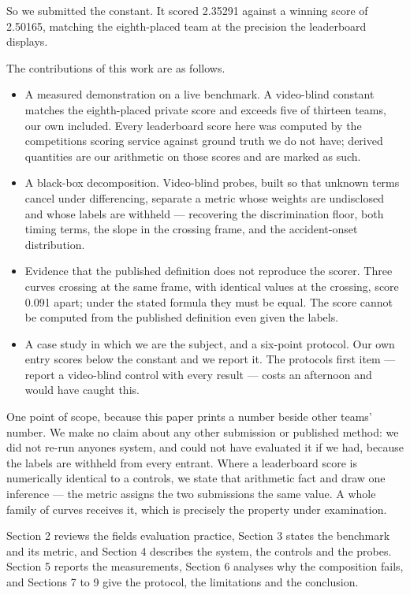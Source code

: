 So we submitted the constant. It scored 2.35291 against a winning score of 2.50165, matching the eighth-placed team at the precision the leaderboard displays.

The contributions of this work are as follows.

\begin{itemize}
\item
  A measured demonstration on a live benchmark. A video-blind constant matches the eighth-placed private score and exceeds five of thirteen teams, our own included. Every leaderboard score here was computed by the competition\textquotesingle s scoring service against ground truth we do not have; derived quantities are our arithmetic on those scores and are marked as such.
\item
  A black-box decomposition. Video-blind probes, built so that unknown terms cancel under differencing, separate a metric whose weights are undisclosed and whose labels are withheld --- recovering the discrimination floor, both timing terms, the slope in the crossing frame, and the accident-onset distribution.
\item
  Evidence that the published definition does not reproduce the scorer. Three curves crossing at the same frame, with identical values at the crossing, score 0.091 apart; under the stated formula they must be equal. The score cannot be computed from the published definition even given the labels.
\item
  A case study in which we are the subject, and a six-point protocol. Our own entry scores below the constant and we report it. The protocol\textquotesingle s first item --- report a video-blind control with every result --- costs an afternoon and would have caught this.
\end{itemize}

One point of scope, because this paper prints a number beside other teams' number. We make no claim about any other submission or published method: we did not re-run anyone\textquotesingle s system, and could not have evaluated it if we had, because the labels are withheld from every entrant. Where a leaderboard score is numerically identical to a control\textquotesingle s, we state that arithmetic fact and draw one inference --- the metric assigns the two submissions the same value. A whole family of curves receives it, which is precisely the property under examination.

Section 2 reviews the field\textquotesingle s evaluation practice, Section 3 states the benchmark and its metric, and Section 4 describes the system, the controls and the probes. Section 5 reports the measurements, Section 6 analyses why the composition fails, and Sections 7 to 9 give the protocol, the limitations and the conclusion.

